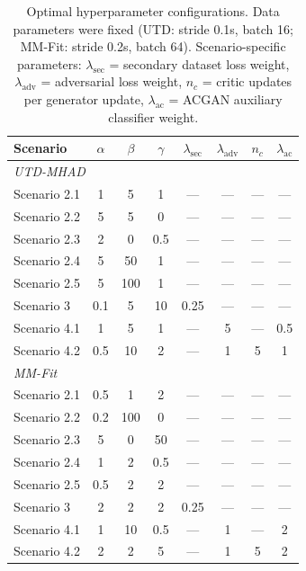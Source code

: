 \begin{table}[!t]
\centering
\caption{Optimal hyperparameter configurations. Data parameters were fixed (UTD: stride 0.1s, batch 16; MM-Fit: stride 0.2s, batch 64). Scenario-specific parameters: $\lambda_{\text{sec}}$ = secondary dataset loss weight, $\lambda_{\text{adv}}$ = adversarial loss weight, $n_c$ = critic updates per generator update, $\lambda_{\text{ac}}$ = ACGAN auxiliary classifier weight\cite{odena2017conditional}.}
\label{tab:optimal-configs}
\begin{tabular}{lccccccc}
\hline
\textbf{Scenario} & $\alpha$ & $\beta$ & $\gamma$ & $\lambda_{\text{sec}}$ & $\lambda_{\text{adv}}$ & $n_c$ & $\lambda_{\text{ac}}$ \\
\hline
\multicolumn{8}{l}{\textit{UTD-MHAD}} \\
Scenario 2.1 & 1 & 5 & 1 & --- & --- & --- & --- \\
Scenario 2.2 & 5 & 5 & 0 & --- & --- & --- & --- \\
Scenario 2.3 & 2 & 0 & 0.5 & --- & --- & --- & --- \\
Scenario 2.4 & 5 & 50 & 1 & --- & --- & --- & --- \\
Scenario 2.5 & 5 & 100 & 1 & --- & --- & --- & --- \\
Scenario 3 & 0.1 & 5 & 10 & 0.25 & --- & --- & --- \\
Scenario 4.1 & 1 & 5 & 1 & --- & 5 & --- & 0.5 \\
Scenario 4.2 & 0.5 & 10 & 2 & --- & 1 & 5 & 1 \\
\hline
\multicolumn{8}{l}{\textit{MM-Fit}} \\
Scenario 2.1 & 0.5 & 1 & 2 & --- & --- & --- & --- \\
Scenario 2.2 & 0.2 & 100 & 0 & --- & --- & --- & --- \\
Scenario 2.3 & 5 & 0 & 50 & --- & --- & --- & --- \\
Scenario 2.4 & 1 & 2 & 0.5 & --- & --- & --- & --- \\
Scenario 2.5 & 0.5 & 2 & 2 & --- & --- & --- & --- \\
Scenario 3 & 2 & 2 & 2 & 0.25 & --- & --- & --- \\
Scenario 4.1 & 1 & 10 & 0.5 & --- & 1 & --- & 2 \\
Scenario 4.2 & 2 & 2 & 5 & --- & 1 & 5 & 2 \\
\hline
\end{tabular}
\end{table}
